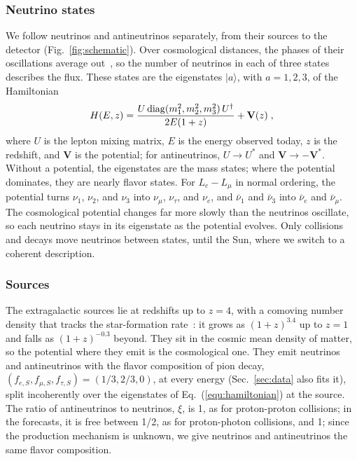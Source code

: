 \documentclass[linenumbers, aps, prd, twocolumn, superscriptaddress, floatfix, longbibliography, nofootinbib, bibnotes]{revtex4-2}
\begin{document}
\subsubsection{Neutrino states}
We follow neutrinos and antineutrinos separately, from their sources to the detector (Fig.~\ref{fig:schematic}).
Over cosmological distances, the phases of their oscillations average out~\cite{Farzan:2008eg}, so the number of neutrinos in each of three states describes the flux.
These states are the eigenstates $|a\rangle$, with $a = 1, 2, 3$, of the Hamiltonian
\begin{equation}
 \label{equ:hamiltonian}
 H(E, z) = \frac{U\, {\rm diag}(m_1^2, m_2^2, m_3^2)\, U^\dagger}{2E(1+z)} + \mathbf{V}(z) \;,
\end{equation}
where $U$ is the lepton mixing matrix, $E$ is the energy observed today, $z$ is the redshift, and $\mathbf{V}$ is the potential; for antineutrinos, $U \to U^*$ and $\mathbf{V} \to -\mathbf{V}^*$.
Without a potential, the eigenstates are the mass states; where the potential dominates, they are nearly flavor states.
For $L_e - L_\mu$ in normal ordering, the potential turns $\nu_1$, $\nu_2$, and $\nu_3$ into $\nu_\mu$, $\nu_\tau$, and $\nu_e$, and $\bar\nu_1$ and $\bar\nu_3$ into $\bar\nu_e$ and $\bar\nu_\mu$.
The cosmological potential changes far more slowly than the neutrinos oscillate, so each neutrino stays in its eigenstate as the potential evolves.
Only collisions and decays move neutrinos between states, until the Sun, where we switch to a coherent description.

\subsubsection{Sources}
The extragalactic sources lie at redshifts up to $z = 4$, with a comoving number density that tracks the star-formation rate~\cite{Yuksel:2008cu}: it grows as $(1+z)^{3.4}$ up to $z = 1$ and falls as $(1+z)^{-0.3}$ beyond.
They sit in the cosmic mean density of matter, so the potential where they emit is the cosmological one.
They emit neutrinos and antineutrinos with the flavor composition of pion decay, $(f_{e,S}, f_{\mu,S}, f_{\tau,S}) = (1/3, 2/3, 0)$, at every energy (Sec.~\ref{sec:data} also fits it), split incoherently over the eigenstates of Eq.~(\ref{equ:hamiltonian}) at the source.
The ratio of antineutrinos to neutrinos, $\xi$, is 1, as for proton-proton collisions; in the forecasts, it is free between 1/2, as for proton-photon collisions, and 1; since the production mechanism is unknown, we give neutrinos and antineutrinos the same flavor composition.
\end{document}

